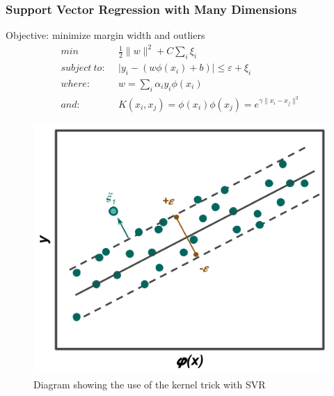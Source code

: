 \begin{frame}
  \frametitle{Support Vector Regression with Many Dimensions}
  \begin{minipage}{.5\textwidth}
    Objective: minimize margin width and outliers
    \scriptsize
    \begin{equation*}
      \begin{split}
        min\ & \frac{1}{2} \lVert w \rVert ^{2} + C \sum_{i} \xi_{i} \\
        subject\ to:\ \ & \lvert y_i - (w \phi(x_i) + b) \rvert \leq \varepsilon + \xi_i \\
        where:\ & w = \sum_{i} \alpha_i y_i \phi(x_i) \\
        and:\ & K(x_i, x_j) = \phi(x_i) \phi(x_j) = e^{\gamma \lVert x_i - x_j \rVert ^{2}}
      \end{split}
    \end{equation*} 
    \normalsize
  \end{minipage}%
  \begin{minipage}{.5\textwidth}
    \centering
    \begin{figure}
      \centering
      \includegraphics[width=\linewidth]{./figures/svr-b.png}
      \caption{Diagram showing the use of the kernel trick with SVR}
    \end{figure}
  \end{minipage}
\end{frame}

